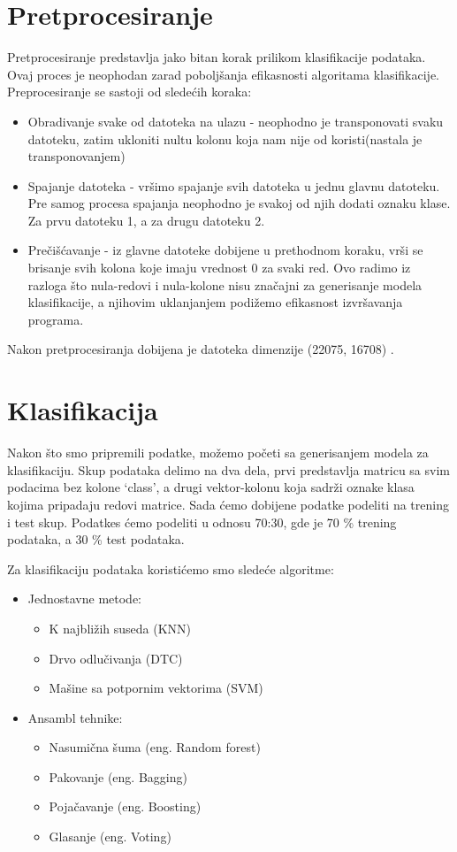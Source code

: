 \documentclass[a4paper]{article}
\begin{document}
\section{Pretprocesiranje}
Pretprocesiranje predstavlja jako bitan korak prilikom klasifikacije podataka. Ovaj proces je neophodan zarad poboljšanja efikasnosti algoritama klasifikacije. Preprocesiranje se sastoji od sledećih koraka:
\begin{itemize}
\item  Obradivanje svake od datoteka na ulazu - neophodno je transponovati svaku datoteku, zatim ukloniti nultu kolonu koja nam nije od
koristi(nastala je transponovanjem)
\item Spajanje datoteka - vršimo spajanje svih datoteka u jednu glavnu
datoteku. Pre samog procesa spajanja neophodno je svakoj od njih
dodati oznaku klase. Za prvu datoteku 1, a za drugu datoteku 2.
\item Prečišćavanje - iz glavne datoteke dobijene u prethodnom koraku,
vrši se brisanje svih kolona koje imaju vrednost 0 za svaki red. Ovo radimo iz razloga  što nula-redovi i nula-kolone nisu značajni za generisanje modela klasifikacije, a njihovim uklanjanjem podižemo efikasnost izvršavanja programa.
\end{itemize}

Nakon pretprocesiranja dobijena je datoteka dimenzije (22075, 16708) .




\section{Klasifikacija}
Nakon što smo pripremili podatke,  možemo početi sa generisanjem modela za klasifikaciju. Skup podataka delimo na dva dela,  prvi predstavlja matricu sa svim podacima bez
kolone ‘class’, a drugi vektor-kolonu koja
sadrži oznake klasa kojima pripadaju redovi matrice.
Sada ćemo dobijene podatke podeliti na trening i test skup. Podatkes ćemo podeliti u odnosu 70:30, gde je  70 \% trening podataka, a 30 \% test podataka.

Za klasifikaciju podataka koristićemo smo sledeće algoritme:

\begin{itemize}
\item Jednostavne metode:
	\begin{itemize}
	\item  K najbližih suseda (KNN)
	\item  Drvo odlučivanja (DTC)
	\item  Mašine sa potpornim vektorima (SVM)
	\end{itemize}

\item Ansambl tehnike:
	\begin{itemize}
	\item  Nasumična šuma (eng. Random forest)
	\item  Pakovanje (eng. Bagging)
	\item  Pojačavanje (eng. Boosting)
	\item  Glasanje (eng. Voting)
	\end{itemize}

\end{itemize}
\end{document}
